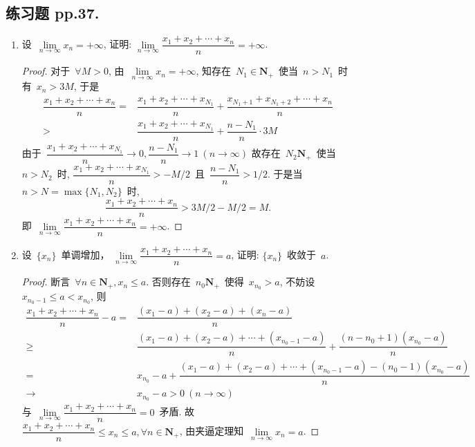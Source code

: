 \documentclass[UTF8,a4paper,10pt,twoside]{book}
\begin{document}
\subsection{练习题 pp.37.}
\begin{enumerate}
	\item 设~$\lim\limits_{n\to\infty} x_n=+\infty$, 证明: $\lim\limits_{n\to\infty} \dfrac{x_1+x_2+\cdots+x_n}{n}=+\infty$.
	      \begin{proof}
		      对于~$\forall M>0$, 由~$\lim\limits_{n\to\infty} x_n=+\infty$, 知存在~$N_1\in\mathbf{N}_{+}$~使当~$n>N_1$~时有~$x_n>3M$, 于是
		      \begin{equation*}
			      \begin{split}
				      \dfrac{x_1+x_2+\cdots+x_n}{n}=&\dfrac{x_1+x_2+\cdots+x_{N_1}}{n}+\dfrac{x_{N_1+1}+x_{N_1+2}+\cdots+x_n}{n}\\
				      >&\dfrac{x_1+x_2+\cdots+x_{N_1}}{n}+\dfrac{n-N_1}{n}\cdot 3M
			      \end{split}
		      \end{equation*}
		      由于~$\dfrac{x_1+x_2+\cdots+x_{N_1}}{n}\to 0, \dfrac{n-N_1}{n}\to 1\ (n\to\infty)$ 故存在~$N_2\mathbf{N}_{+}$~使当~$n>N_2$~时, $\dfrac{x_1+x_2+\cdots+x_{N_1}}{n}>-M/2$~且~$\dfrac{n-N_1}{n}>1/2$. 于是当~$n>N=\max\{N_1,N_2\}$~时,
		      \[
			      \dfrac{x_1+x_2+\cdots+x_n}{n}>3M/2-M/2=M.
		      \]
		      即~$\lim\limits_{n\to\infty} \dfrac{x_1+x_2+\cdots+x_n}{n}=+\infty$.\qedhere
	      \end{proof}
	\item 设~$\{x_n\}$~单调增加， $\lim\limits_{n\to\infty} \dfrac{x_1+x_2+\cdots+x_n}{n}=a$, 证明: $\{x_n\}$~收敛于~$a$.
	      \begin{proof}
		      断言~$\forall n\in\mathbf{N}_{+}, x_n\leqslant a$. 否则存在~$n_0\mathbf{N}_{+}$~使得~$x_{n_0}>a$, 不妨设~$x_{n_0-1}\leqslant a<x_{n_0}$, 则
		      \begin{equation*}
			      \begin{split}
				      \dfrac{x_1+x_2+\cdots+x_n}{n}-a=&\dfrac{(x_1-a)+(x_2-a)+(x_n-a)}{n}\\
				      \geqslant& \dfrac{(x_1-a)+(x_2-a)+\cdots+(x_{n_0-1}-a)}{n}+\dfrac{(n-n_0+1)(x_{n_0}-a)}{n}\\
				      =& x_{n_0}-a+\dfrac{(x_1-a)+(x_2-a)+\cdots+(x_{n_0-1}-a)-(n_0-1)(x_{n_0}-a)}{n}\\
				      \to& x_{n_0}-a>0\ (n\to\infty)
			      \end{split}
		      \end{equation*}
		      与~$\lim\limits_{n\to\infty} \dfrac{x_1+x_2+\cdots+x_n}{n}=0$~矛盾. 故~$\dfrac{x_1+x_2+\cdots+x_n}{n}\leqslant x_n\leqslant a, \forall n\in\mathbf{N}_{+}$, 由夹逼定理知~$\lim\limits_{n\to\infty} x_n=a$.\qedhere

\end{proof}
\end{enumerate}
\end{document}
